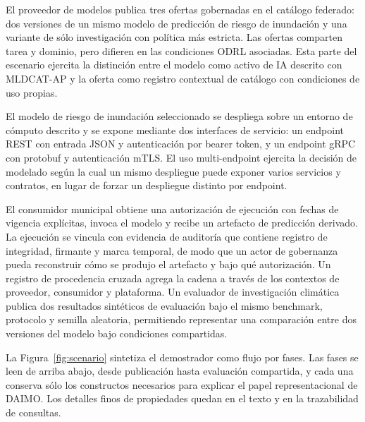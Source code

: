 \documentclass[Afour,sagev,times]{sagej}
\begin{document}
El proveedor de modelos publica tres ofertas gobernadas en el catálogo federado: dos versiones de un mismo modelo de predicción de riesgo de inundación y una variante de sólo investigación con política más estricta. Las ofertas comparten tarea y dominio, pero difieren en las condiciones ODRL asociadas. Esta parte del escenario ejercita la distinción entre el modelo como activo de IA descrito con MLDCAT-AP y la oferta como registro contextual de catálogo con condiciones de uso propias.

El modelo de riesgo de inundación seleccionado se despliega sobre un entorno de cómputo descrito y se expone mediante dos interfaces de servicio: un endpoint REST con entrada JSON y autenticación por bearer token, y un endpoint gRPC con protobuf y autenticación mTLS. El uso multi-endpoint ejercita la decisión de modelado según la cual un mismo despliegue puede exponer varios servicios y contratos, en lugar de forzar un despliegue distinto por endpoint.

El consumidor municipal obtiene una autorización de ejecución con fechas de vigencia explícitas, invoca el modelo y recibe un artefacto de predicción derivado. La ejecución se vincula con evidencia de auditoría que contiene registro de integridad, firmante y marca temporal, de modo que un actor de gobernanza pueda reconstruir cómo se produjo el artefacto y bajo qué autorización. Un registro de procedencia cruzada agrega la cadena a través de los contextos de proveedor, consumidor y plataforma. Un evaluador de investigación climática publica dos resultados sintéticos de evaluación bajo el mismo benchmark, protocolo y semilla aleatoria, permitiendo representar una comparación entre dos versiones del modelo bajo condiciones compartidas.

La Figura~\ref{fig:scenario} sintetiza el demostrador como flujo por fases. Las fases se leen de arriba abajo, desde publicación hasta evaluación compartida, y cada una conserva sólo los constructos necesarios para explicar el papel representacional de DAIMO. Los detalles finos de propiedades quedan en el texto y en la trazabilidad de consultas.
\end{document}
